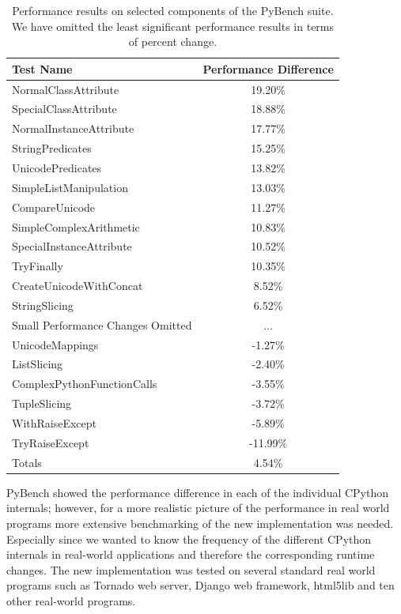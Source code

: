 \documentclass[runningheads,a4paper]{llncs}
\begin{document}
\begin{table}
\centering
  \caption{Performance results on selected components of the PyBench suite.  We
    have omitted the least significant performance results in terms of percent
    change.
  }
\begin{tabular}{| l | c |}
  \hline
  \textbf{Test Name} & \textbf{Performance Difference} \\ \hline
  NormalClassAttribute &  19.20\% \\ \hline
  SpecialClassAttribute &  18.88\% \\ \hline
  NormalInstanceAttribute &  17.77\% \\ \hline
  StringPredicates &  15.25\% \\ \hline
  UnicodePredicates &  13.82\% \\ \hline
  SimpleListManipulation &  13.03\% \\ \hline
  CompareUnicode &  11.27\% \\ \hline
  SimpleComplexArithmetic &  10.83\% \\ \hline
  SpecialInstanceAttribute &  10.52\% \\ \hline
  TryFinally &  10.35\% \\ \hline
  CreateUnicodeWithConcat &  8.52\% \\ \hline
  StringSlicing &  6.52\% \\ \hline
  Small Performance Changes Omitted & ... \\ \hline
  UnicodeMappings &  -1.27\% \\ \hline
  ListSlicing &  -2.40\% \\ \hline
  ComplexPythonFunctionCalls &  -3.55\% \\ \hline
  TupleSlicing &  -3.72\% \\ \hline
  WithRaiseExcept &  -5.89\% \\ \hline
  TryRaiseExcept &  -11.99\% \\ \hline
  Totals & 4.54\% \\ \hline
\end{tabular}
\label{pybenchtable}
\end{table}

PyBench showed the performance difference in each of the individual CPython
internals; however, for a more realistic picture of the performance in real world
programs more extensive benchmarking of the new implementation was needed.
Especially since we wanted to know the frequency of the different CPython
internals in real-world applications and therefore the corresponding runtime
changes. The new implementation was tested on several standard real world
programs such as Tornado web server, Django web framework, html5lib and ten other real-world programs. 
\end{document}
